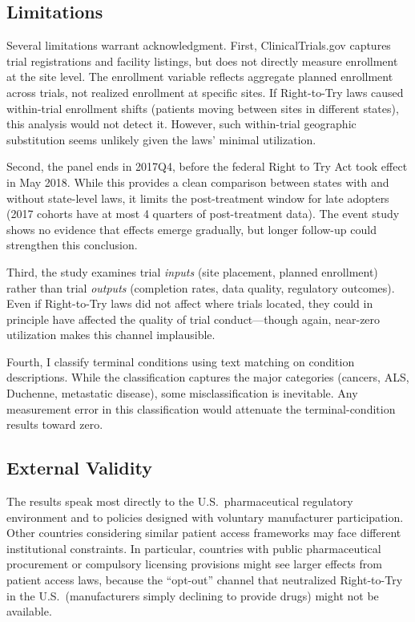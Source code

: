 \documentclass[12pt]{article}
\begin{document}
\subsection{Limitations}

Several limitations warrant acknowledgment. First, ClinicalTrials.gov captures trial registrations and facility listings, but does not directly measure enrollment at the site level. The enrollment variable reflects aggregate planned enrollment across trials, not realized enrollment at specific sites. If Right-to-Try laws caused within-trial enrollment shifts (patients moving between sites in different states), this analysis would not detect it. However, such within-trial geographic substitution seems unlikely given the laws' minimal utilization.

Second, the panel ends in 2017Q4, before the federal Right to Try Act took effect in May 2018. While this provides a clean comparison between states with and without state-level laws, it limits the post-treatment window for late adopters (2017 cohorts have at most 4 quarters of post-treatment data). The event study shows no evidence that effects emerge gradually, but longer follow-up could strengthen this conclusion.

Third, the study examines trial \textit{inputs} (site placement, planned enrollment) rather than trial \textit{outputs} (completion rates, data quality, regulatory outcomes). Even if Right-to-Try laws did not affect where trials located, they could in principle have affected the quality of trial conduct---though again, near-zero utilization makes this channel implausible.

Fourth, I classify terminal conditions using text matching on condition descriptions. While the classification captures the major categories (cancers, ALS, Duchenne, metastatic disease), some misclassification is inevitable. Any measurement error in this classification would attenuate the terminal-condition results toward zero.

\subsection{External Validity}

The results speak most directly to the U.S.\ pharmaceutical regulatory environment and to policies designed with voluntary manufacturer participation. Other countries considering similar patient access frameworks may face different institutional constraints. In particular, countries with public pharmaceutical procurement or compulsory licensing provisions might see larger effects from patient access laws, because the ``opt-out'' channel that neutralized Right-to-Try in the U.S.\ (manufacturers simply declining to provide drugs) might not be available.
\end{document}
